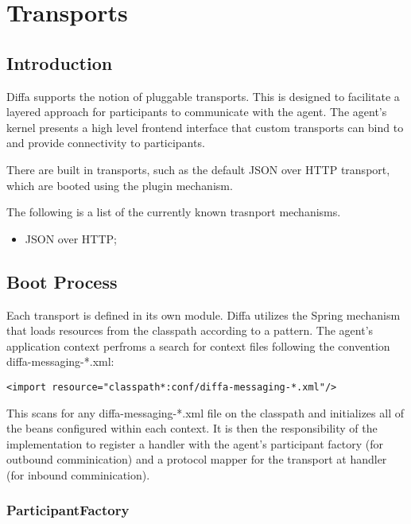 \chapter{Transports}

\section{Introduction}

Diffa supports the notion of pluggable transports. This is designed to facilitate a layered approach for participants to communicate with the agent. The agent's kernel presents a high level frontend interface that custom transports can bind to and provide connectivity to participants.

There are built in transports, such as the default JSON over HTTP transport, which are booted using the plugin mechanism.

The following is a list of the currently known trasnport mechanisms.

\begin{itemize}
	\item JSON over HTTP;
\end{itemize}

\section{Boot Process}

Each transport is defined in its own module. Diffa utilizes the Spring mechanism that loads resources from the classpath according to a pattern. The agent's application context perfroms a search for context files following the convention diffa-messaging-*.xml:

\begin{lstlisting}
<import resource="classpath*:conf/diffa-messaging-*.xml"/>
\end{lstlisting}

This scans for any diffa-messaging-*.xml file on the classpath and initializes all of the beans configured within each context. It is then the responsibility of the implementation to register a handler with the agent's participant factory (for outbound comminication) and a protocol mapper for the transport at handler (for inbound comminication).

\subsection{ParticipantFactory}

